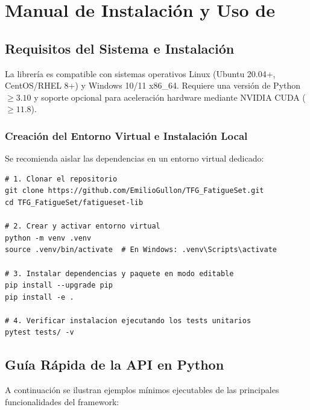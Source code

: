 
\chapter{Manual de Instalación y Uso de }
\label{ap:manual_libreria}

\section{Requisitos del Sistema e Instalación}
\label{sec:ap_instalacion}

La librería  es compatible con sistemas operativos Linux (Ubuntu 20.04+, CentOS/RHEL 8+) y Windows 10/11 x86\_64. Requiere una versión de Python $\ge 3.10$ y soporte opcional para aceleración hardware mediante NVIDIA CUDA ($\ge 11.8$).

\subsection{Creación del Entorno Virtual e Instalación Local}
Se recomienda aislar las dependencias en un entorno virtual dedicado:

\begin{lstlisting}[style=bashstyle, caption={Instalación de \code{fatigueset-lib} en modo desarrollo editable.}]
# 1. Clonar el repositorio
git clone https://github.com/EmilioGullon/TFG_FatigueSet.git
cd TFG_FatigueSet/fatigueset-lib

# 2. Crear y activar entorno virtual
python -m venv .venv
source .venv/bin/activate  # En Windows: .venv\Scripts\activate

# 3. Instalar dependencias y paquete en modo editable
pip install --upgrade pip
pip install -e .

# 4. Verificar instalacion ejecutando los tests unitarios
pytest tests/ -v
\end{lstlisting}

\section{Guía Rápida de la API en Python}
\label{sec:ap_api_guia}

A continuación se ilustran ejemplos mínimos ejecutables de las principales funcionalidades del framework:

